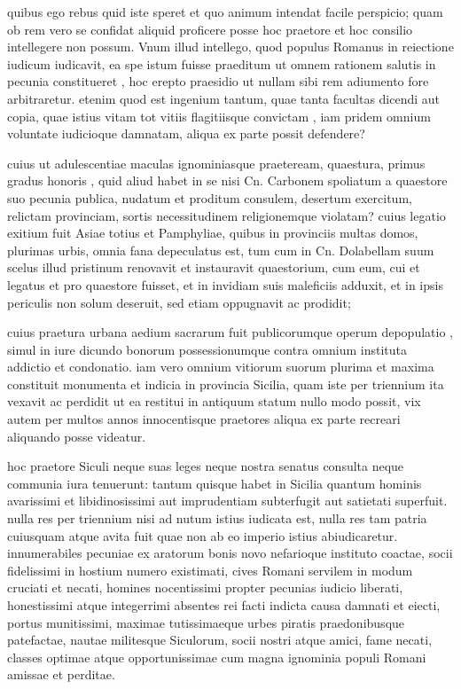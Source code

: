  quibus ego rebus quid iste speret et quo animum intendat facile perspicio; quam ob rem vero se confidat aliquid proficere posse hoc praetore et hoc consilio intellegere non possum. Vnum illud intellego, quod populus Romanus in reiectione iudicum iudicavit, ea spe istum fuisse praeditum ut omnem rationem salutis in pecunia constitueret , hoc erepto praesidio ut nullam sibi rem adiumento fore arbitraretur. etenim quod est ingenium tantum, quae tanta facultas dicendi aut copia, quae istius vitam tot vitiis flagitiisque convictam , iam pridem omnium voluntate iudicioque damnatam, aliqua ex parte possit defendere?

 cuius ut adulescentiae maculas ignominiasque praeteream, quaestura, primus gradus honoris , quid aliud habet in se nisi Cn. Carbonem spoliatum a quaestore suo pecunia publica, nudatum et proditum consulem, desertum exercitum, relictam provinciam, sortis necessitudinem religionemque violatam? cuius legatio exitium fuit Asiae totius et Pamphyliae, quibus in provinciis multas domos, plurimas urbis, omnia fana depeculatus est, tum cum in Cn. Dolabellam suum scelus illud pristinum renovavit et instauravit quaestorium, cum eum, cui et legatus et pro quaestore fuisset, et in invidiam suis maleficiis adduxit, et in ipsis periculis non solum deseruit, sed etiam oppugnavit ac prodidit;

 cuius praetura urbana aedium sacrarum fuit publicorumque operum depopulatio , simul in iure dicundo bonorum possessionumque contra omnium instituta addictio et condonatio. iam vero omnium vitiorum suorum plurima et maxima constituit monumenta et indicia in provincia Sicilia, quam iste per triennium ita vexavit ac perdidit ut ea restitui in antiquum statum nullo modo possit, vix autem per multos annos innocentisque praetores aliqua ex parte recreari aliquando posse videatur.

 hoc praetore Siculi neque suas leges neque nostra senatus consulta neque communia iura tenuerunt: tantum quisque habet in Sicilia quantum hominis avarissimi et libidinosissimi aut imprudentiam subterfugit aut satietati superfuit. nulla res per triennium nisi ad nutum istius iudicata est, nulla res tam patria cuiusquam atque avita fuit quae non ab eo imperio istius abiudicaretur. innumerabiles pecuniae ex aratorum bonis novo nefarioque instituto coactae, socii fidelissimi in hostium numero existimati, cives Romani servilem in modum cruciati et necati, homines nocentissimi propter pecunias iudicio liberati, honestissimi atque integerrimi absentes rei facti indicta causa damnati et eiecti, portus munitissimi, maximae tutissimaeque urbes piratis praedonibusque patefactae, nautae militesque Siculorum, socii nostri atque amici, fame necati, classes optimae atque opportunissimae cum magna ignominia populi Romani amissae et perditae.


